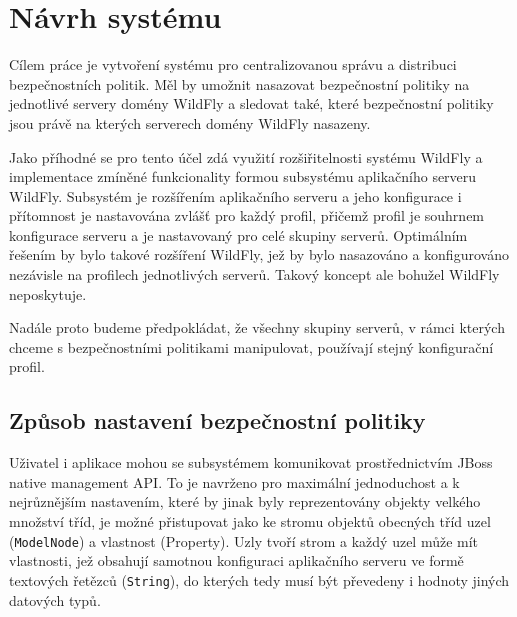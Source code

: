 \chapter{Návrh systému}

Cílem práce je vytvoření systému pro centralizovanou správu a distribuci bezpečnostních politik. Měl by umožnit nasazovat bezpečnostní politiky na jednotlivé servery domény WildFly a sledovat také, které bezpečnostní politiky jsou právě na kterých serverech domény WildFly nasazeny.

Jako příhodné se pro tento účel zdá využití rozšiřitelnosti systému WildFly a implementace zmíněné funkcionality formou subsystému aplikačního serveru WildFly. Subsystém je rozšířením aplikačního serveru a jeho konfigurace i přítomnost je nastavována zvlášť pro každý profil, přičemž profil je souhrnem konfigurace serveru a je nastavovaný pro celé skupiny serverů. Optimálním řešením by bylo takové rozšíření WildFly, jež by bylo nasazováno a konfigurováno nezávisle na profilech jednotlivých serverů. Takový koncept ale bohužel WildFly neposkytuje.

Nadále proto budeme předpokládat, že všechny skupiny serverů, v rámci kterých chceme s bezpečnostními politikami manipulovat, používají stejný konfigurační profil.

\section{Způsob nastavení bezpečnostní politiky}

Uživatel i aplikace mohou se subsystémem komunikovat prostřednictvím JBoss native management API. To je navrženo pro maximální jednoduchost a k nejrůznějším nastavením, které by jinak byly reprezentovány objekty velkého množství tříd, je možné přistupovat jako ke stromu objektů obecných tříd uzel ({\tt ModelNode}) a vlastnost (Property). Uzly tvoří strom a každý uzel může mít vlastnosti, jež obsahují samotnou konfiguraci aplikačního serveru ve formě textových řetězců ({\tt String}), do kterých tedy musí být převedeny i hodnoty jiných datových typů. \cite{jbossDetypedManagement}

